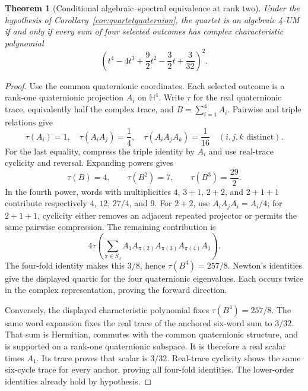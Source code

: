 \documentclass[11pt]{article}
\newtheorem{theorem}{Theorem}[section]
\begin{document}
\begin{theorem}[Conditional algebraic--spectral equivalence at rank two]
\label{thm:conditionalfour}
Under the hypothesis of Corollary~\ref{cor:quartetquaternion}, the quartet
is an algebraic 4-UM if and only if every sum of four selected outcomes
has complex characteristic polynomial
\[
 \left(t^4-4t^3+\frac92t^2-\frac32t+\frac3{32}\right)^2.
\]
\end{theorem}
\begin{proof}
Use the common quaternionic coordinates. Each selected outcome is a
rank-one quaternionic projection $A_i$ on $\mathbb H^4$.
Write $\tau$ for the real quaternionic trace, equivalently half the
complex trace, and $B=\sum_{i=1}^4 A_i$. Pairwise and triple relations give
\[
 \tau(A_i)=1,\quad \tau(A_iA_j)=\frac14,\quad
 \tau(A_iA_jA_k)=\frac1{16}\quad(i,j,k\text{ distinct}).
\]
For the last equality, compress the triple identity by $A_i$ and use
real-trace cyclicity and reversal. Expanding powers gives
\[
 \tau(B)=4,\qquad \tau(B^2)=7,\qquad
 \tau(B^3)=\frac{29}2.
\]
In the fourth power, words with multiplicities $4$, $3+1$, $2+2$,
and $2+1+1$ contribute respectively $4$, $12$, $27/4$, and $9$.
For $2+2$, use $A_iA_jA_i=A_i/4$; for $2+1+1$, cyclicity either
removes an adjacent repeated projector or permits the same pairwise
compression. The remaining contribution is
\[
 4\tau\left(\sum_{\pi\in S_3}
 A_1A_{\pi(2)}A_{\pi(3)}A_{\pi(4)}A_1\right).
\]
The four-fold identity makes this $3/8$, hence
$\tau(B^4)=257/8$. Newton's identities give the displayed quartic
for the four quaternionic eigenvalues. Each occurs twice in the complex
representation, proving the forward direction.

Conversely, the displayed characteristic polynomial fixes
$\tau(B^4)=257/8$. The same word expansion fixes the real trace of
the anchored six-word sum to $3/32$. That sum is Hermitian, commutes
with the common quaternionic structure, and is supported on a rank-one
quaternionic subspace. It is therefore a real scalar times $A_1$.
Its trace proves that scalar is $3/32$. Real-trace cyclicity shows the
same six-cycle trace for every anchor, proving all four-fold identities.
The lower-order identities already hold by hypothesis.
\end{proof}
\end{document}
